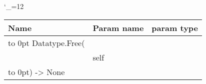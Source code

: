 \begingroup \catcode`\_=12 \tt
\begin{tabular}{lll}
\toprule
\textrm{Name}&\textrm{Param name}&\textrm{param type}\\
\midrule
\hbox to 0pt {Datatype.Free(\hss}\\
& self\\
\hbox to 0pt{) -> None\hss}\\
\bottomrule
\end{tabular}
\endgroup
